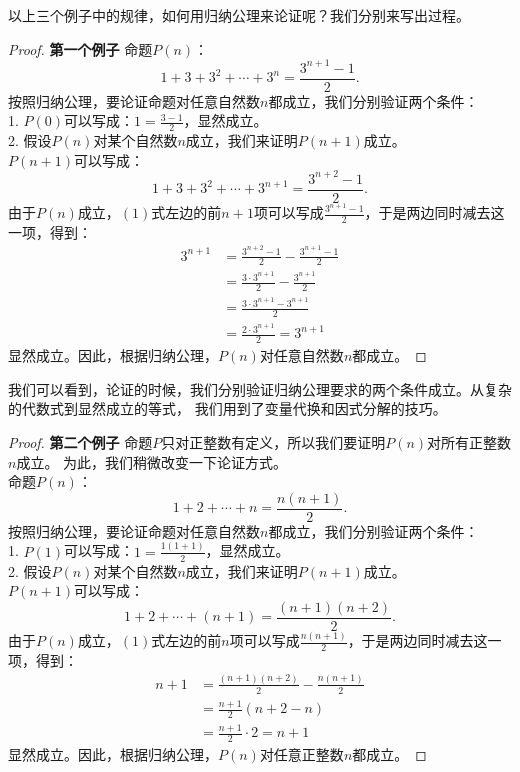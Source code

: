 \documentclass[12pt,UTF8]{ctexbook}
\begin{document}
以上三个例子中的规律，如何用归纳公理来论证呢？我们分别来写出过程。
\begin{proof}{\textbf{第一个例子 }}
    命题$P(n)$：
    $$ 1 + 3 + 3^2 + \cdots + 3^n = \frac{3^{n+1} - 1}{2}. $$
    按照归纳公理，要论证命题对任意自然数$n$都成立，我们分别验证两个条件：\\
    1. $P(0)$可以写成：$1 = \frac{3 - 1}{2}$，显然成立。\\
    2. 假设$P(n)$对某个自然数$n$成立，我们来证明$P(n+1)$成立。\\
    $P(n+1)$可以写成：
    $$ 1 + 3 + 3^2 + \cdots + 3^{n+1} = \frac{3^{n+2} - 1}{2}. $$
    由于$P(n)$成立，$(1)$式左边的前$n+1$项可以写成$\frac{3^{n+1} - 1}{2}$，于是两边同时减去这一项，得到：
    \begin{align*}
        3^{n+1} &= \frac{3^{n+2} - 1}{2} - \frac{3^{n+1} - 1}{2}  \\
        &= \frac{3\cdot 3^{n+1}}{2} - \frac{3^{n+1}}{2}  \\
        &= \frac{3\cdot 3^{n+1} - 3^{n+1}}{2}  \\
        &= \frac{2 \cdot 3^{n+1}}{2} = 3^{n+1} 
    \end{align*}
    显然成立。因此，根据归纳公理，$P(n)$对任意自然数$n$都成立。    
\end{proof}

我们可以看到，论证的时候，我们分别验证归纳公理要求的两个条件成立。从复杂的代数式到显然成立的等式，
我们用到了变量代换和因式分解的技巧。

\begin{proof}{\textbf{第二个例子 }}
    命题$P$只对正整数有定义，所以我们要证明$P(n)$对所有正整数$n$成立。
    为此，我们稍微改变一下论证方式。\\
    命题$P(n)$：
    $$ 1 + 2 + \cdots + n = \frac{n(n+1)}{2}. $$
    按照归纳公理，要论证命题对任意自然数$n$都成立，我们分别验证两个条件：\\
    1. $P(1)$可以写成：$1 = \frac{1(1+1)}{2}$，显然成立。\\
    2. 假设$P(n)$对某个自然数$n$成立，我们来证明$P(n+1)$成立。\\
    $P(n+1)$可以写成：
    $$ 1 + 2 + \cdots + (n+1) = \frac{(n+1)(n+2)}{2}.  $$
    由于$P(n)$成立，$(1)$式左边的前$n$项可以写成$\frac{n(n+1)}{2}$，于是两边同时减去这一项，得到：
    \begin{align*}
        n+1 &= \frac{(n+1)(n+2)}{2} - \frac{n(n+1)}{2}  \\
        &= \frac{n+1}{2}\left(n+2 - n\right)  \\
        &= \frac{n+1}{2} \cdot 2 = n+1 
    \end{align*}
    显然成立。因此，根据归纳公理，$P(n)$对任意正整数$n$都成立。    
\end{proof}
\end{document}
